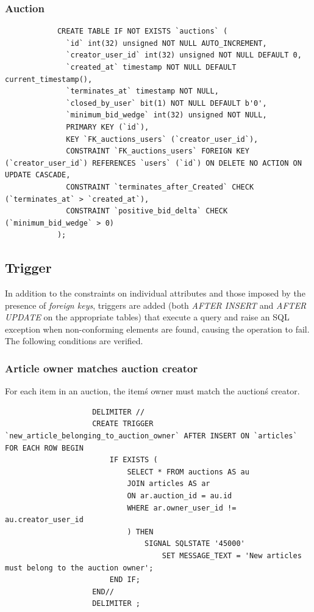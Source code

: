 \documentclass[12pt, a4paper, renqo, final]{amsart}
\begin{document}
		\subsubsection{Auction}
		\phantom{.}
		\begin{lstlisting}
			CREATE TABLE IF NOT EXISTS `auctions` (
			  `id` int(32) unsigned NOT NULL AUTO_INCREMENT,
			  `creator_user_id` int(32) unsigned NOT NULL DEFAULT 0,
			  `created_at` timestamp NOT NULL DEFAULT current_timestamp(),
			  `terminates_at` timestamp NOT NULL,
			  `closed_by_user` bit(1) NOT NULL DEFAULT b'0',
			  `minimum_bid_wedge` int(32) unsigned NOT NULL,
			  PRIMARY KEY (`id`),
			  KEY `FK_auctions_users` (`creator_user_id`),
			  CONSTRAINT `FK_auctions_users` FOREIGN KEY (`creator_user_id`) REFERENCES `users` (`id`) ON DELETE NO ACTION ON UPDATE CASCADE,
			  CONSTRAINT `terminates_after_Created` CHECK (`terminates_at` > `created_at`),
			  CONSTRAINT `positive_bid_delta` CHECK (`minimum_bid_wedge` > 0)
			);
		\end{lstlisting}		
		

		\subsection{Trigger}
			In addition to the constraints on individual attributes and those imposed by the presence of \textit{foreign keys}, triggers are added (both \textit{AFTER INSERT} and \textit{AFTER UPDATE} on the appropriate tables) that execute a query and raise an SQL exception when non-conforming elements are found, causing the operation to fail. The following conditions are verified.\\
				\subsubsection{Article owner matches auction creator} For each item in an auction, the item\'s owner must match the auction\'s creator.
				\begin{lstlisting}
					DELIMITER //
					CREATE TRIGGER `new_article_belonging_to_auction_owner` AFTER INSERT ON `articles` FOR EACH ROW BEGIN
						IF EXISTS (
							SELECT * FROM auctions AS au
							JOIN articles AS ar
							ON ar.auction_id = au.id
							WHERE ar.owner_user_id != au.creator_user_id
							) THEN
								SIGNAL SQLSTATE '45000'
									SET MESSAGE_TEXT = 'New articles must belong to the auction owner';
						END IF;
					END//
					DELIMITER ;
				\end{lstlisting}
				\phantom{.}\\
				
\end{document}
